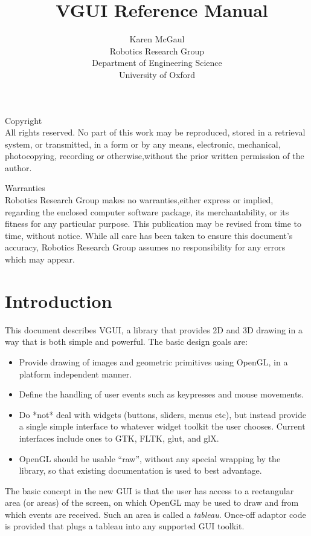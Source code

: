 \documentclass[12pt]{report} \usepackage{epsfig}
\begin{document}
\title {\ VGUI Reference Manual }

\author{Karen McGaul \\ Robotics Research Group \\ Department of
  Engineering Science\\ University of Oxford}

\maketitle
{}

{\sf\large Copyright} \\
All rights reserved. No part of this work may be reproduced, stored in
a retrieval system, or transmitted, in a form or by any means,
electronic, mechanical, photocopying, recording or otherwise,without
the prior written permission of the author.

\bigskip

{\sf\large Warranties} \\
Robotics Research Group makes no warranties,either express or implied,
regarding the enclosed computer software package, its merchantability,
or its fitness for any particular purpose. This publication may be
revised from time to time, without notice. 
While all care has been taken to ensure this document's accuracy,
Robotics Research Group assumes no responsibility for any errors which
may appear.

\newpage
\tableofcontents
\newpage

\chapter{Introduction}

This document describes VGUI, a library that provides 2D and 3D drawing in a way
that is both simple and powerful.  The basic design goals are:
\begin{itemize}
\item   Provide drawing of images and geometric primitives using OpenGL,
        in a platform independent manner.
\item   Define the handling of user events such as keypresses and mouse
        movements.
\item   Do *not* deal with widgets (buttons, sliders, menus etc), but
        instead provide a single simple interface to whatever widget
        toolkit the user chooses.  Current interfaces include ones to GTK, FLTK,
        glut, and glX.
\item   OpenGL should be usable ``raw'', without any special wrapping by the
        library, so that existing documentation is used to best advantage.
\end{itemize}
The basic concept in the new GUI is that the user has access to a rectangular area
(or areas) of the screen, on which OpenGL may be used to draw and from
which events are received.  Such an area is called a {\it tableau}.
Once-off adaptor code is provided that plugs a tableau into any supported GUI toolkit.
\end{document}

